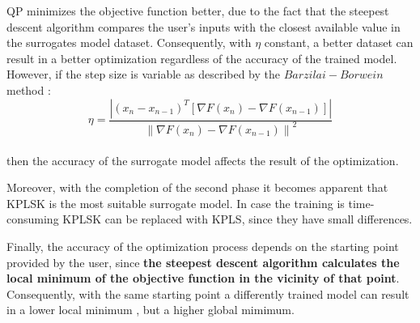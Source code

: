 QP minimizes the objective function better, due to
the fact that the steepest descent algorithm compares 
the user's inputs with the closest available value in 
the surrogates model dataset. Consequently, with $\eta$
constant, a better dataset can result in a better 
optimization regardless of the accuracy of the trained 
model. However, if the step size is variable 
as described by the $Barzilai - Borwein$ method :
\\
\begin{equation}
	\eta = \frac{\left| \left(x_{n} -x_{n-1}
    \right)^{T}  \left[ \nabla F(x_{n}) - 
    \nabla F(x_{n-1}) \right] \right|}
	{\left\| \nabla F(x_{n}) - \nabla F(x_{n-1})
	 \right\|^2}
\end{equation}
\\
then the accuracy of the surrogate model affects the 
result of the optimization. 

Moreover, with the completion of the second phase it 
becomes apparent that KPLSK is the most suitable 
surrogate model. In case the training is time-consuming
KPLSK can be replaced with KPLS, since they have small
differences.

Finally, the accuracy of the optimization process 
depends on the starting point provided by the user,
since \textbf{the steepest descent algorithm calculates 
the local minimum of the objective function in the 
vicinity of that point}. Consequently, with the same 
starting point a differently trained model can result 
in a lower local minimum , but a higher global mimimum.